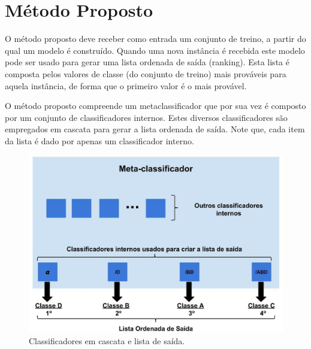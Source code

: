 \chapter{Método Proposto}
\label{chap:metodoproposto}

O método proposto deve receber como entrada um conjunto de treino, a partir do qual um modelo é construído. Quando uma nova instância é recebida este modelo pode ser usado para gerar uma lista ordenada de saída (ranking). Esta lista é composta pelos valores de classe (do conjunto de treino) mais prováveis para aquela instância, de forma que o primeiro valor é o mais provável. 

O método proposto compreende um metaclassificador que por sua vez é composto por um conjunto de classificadores internos. Estes diversos classificadores são empregados em cascata para gerar a lista ordenada de saída. Note que, cada item da lista é dado por apenas um classificador interno. 

\begin{figure}[h!]
  \includegraphics[width=\linewidth]{images/metodoproposto01.eps}
  \caption{Classificadores em cascata e lista de saída.}
  \label{fig:metodoproposto01}
\end{figure}

